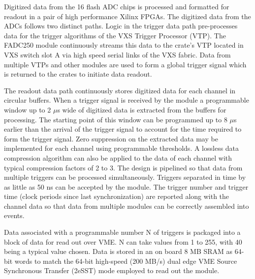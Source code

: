 Digitized data from the 16 flash ADC chips is processed and formatted for readout in a pair of high performance Xilinx FPGAs. The digitized data from the ADCs follows two distinct paths.  Logic in the trigger data path pre-processes data for the trigger algorithms of the VXS Trigger Processor (VTP). The FADC250 module continuously streams this data to the crate’s VTP located in VXS switch slot A via high speed serial links of the VXS fabric.  Data from multiple VTPs and other modules are used to form a global trigger signal which is returned to the crates to initiate data readout.

The readout data path continuously stores digitized data for each channel in circular buffers. When a trigger signal is 
received by the module a programmable window up to 2 $\mu$s wide of digitized data is extracted from the buffers for
processing. The starting point of this window can be programmed up to 8 $\mu$s earlier than the arrival of the trigger
signal to account for the time required to form the trigger signal.  Zero suppression on the extracted data may be 
implemented for each channel using programmable thresholds.  A lossless data compression algorithm can also be applied to the data of each channel with typical compression factors of 2 to 3. The design is pipelined so that data from multiple triggers can be processed simultaneously.  Triggers separated in time by as little as 50 ns can be accepted by the module. The trigger number and trigger time (clock periods since last synchronization) are reported along with the channel data so that data from multiple modules can be correctly assembled into events. 

Data associated with a programmable number N of triggers is packaged into a block of data for read out over VME.  N can take values from 1 to 255, with 40 being a typical value chosen.  Data is stored in an on board 8 MB SRAM as 64-bit words to match the 64-bit high-speed (200 MB/s) dual edge VME Source Synchronous Transfer (2eSST) mode employed to read out the module.  

